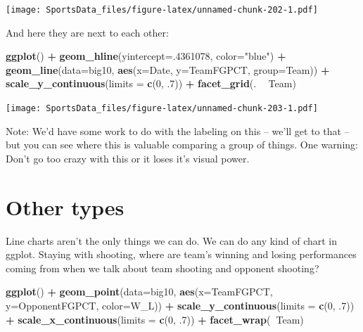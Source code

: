 \documentclass[
]{book}
\newenvironment{Shaded}{\begin{snugshade}}{\end{snugshade}}
\newcommand{\DataTypeTok}[1]{\textcolor[rgb]{0.13,0.29,0.53}{#1}}
\newcommand{\DecValTok}[1]{\textcolor[rgb]{0.00,0.00,0.81}{#1}}
\newcommand{\FloatTok}[1]{\textcolor[rgb]{0.00,0.00,0.81}{#1}}
\newcommand{\KeywordTok}[1]{\textcolor[rgb]{0.13,0.29,0.53}{\textbf{#1}}}
\newcommand{\NormalTok}[1]{#1}
\newcommand{\OperatorTok}[1]{\textcolor[rgb]{0.81,0.36,0.00}{\textbf{#1}}}
\newcommand{\StringTok}[1]{\textcolor[rgb]{0.31,0.60,0.02}{#1}}
\begin{document}
\texttt{[image: SportsData\_files/figure-latex/unnamed-chunk-202-1.pdf]}

And here they are next to each other:

\begin{Shaded}
\begin{Highlighting}[]
\KeywordTok{ggplot}\NormalTok{() }\OperatorTok{+}\StringTok{ }
\StringTok{  }\KeywordTok{geom_hline}\NormalTok{(}\DataTypeTok{yintercept=}\NormalTok{.}\DecValTok{4361078}\NormalTok{, }\DataTypeTok{color=}\StringTok{"blue"}\NormalTok{) }\OperatorTok{+}\StringTok{ }
\StringTok{  }\KeywordTok{geom_line}\NormalTok{(}\DataTypeTok{data=}\NormalTok{big10, }\KeywordTok{aes}\NormalTok{(}\DataTypeTok{x=}\NormalTok{Date, }\DataTypeTok{y=}\NormalTok{TeamFGPCT, }\DataTypeTok{group=}\NormalTok{Team)) }\OperatorTok{+}\StringTok{ }
\StringTok{  }\KeywordTok{scale_y_continuous}\NormalTok{(}\DataTypeTok{limits =} \KeywordTok{c}\NormalTok{(}\DecValTok{0}\NormalTok{, }\FloatTok{.7}\NormalTok{)) }\OperatorTok{+}\StringTok{ }
\StringTok{  }\KeywordTok{facet_grid}\NormalTok{(. }\OperatorTok{~}\StringTok{ }\NormalTok{Team)}
\end{Highlighting}
\end{Shaded}

\texttt{[image: SportsData\_files/figure-latex/unnamed-chunk-203-1.pdf]}

Note: We'd have some work to do with the labeling on this -- we'll get to that -- but you can see where this is valuable comparing a group of things. One warning: Don't go too crazy with this or it loses it's visual power.

\hypertarget{other-types}{%
\section{Other types}\label{other-types}}

Line charts aren't the only things we can do. We can do any kind of chart in ggplot. Staying with shooting, where are team's winning and losing performances coming from when we talk about team shooting and opponent shooting?

\begin{Shaded}
\begin{Highlighting}[]
\KeywordTok{ggplot}\NormalTok{() }\OperatorTok{+}\StringTok{ }
\StringTok{  }\KeywordTok{geom_point}\NormalTok{(}\DataTypeTok{data=}\NormalTok{big10, }\KeywordTok{aes}\NormalTok{(}\DataTypeTok{x=}\NormalTok{TeamFGPCT, }\DataTypeTok{y=}\NormalTok{OpponentFGPCT, }\DataTypeTok{color=}\NormalTok{W_L)) }\OperatorTok{+}
\StringTok{  }\KeywordTok{scale_y_continuous}\NormalTok{(}\DataTypeTok{limits =} \KeywordTok{c}\NormalTok{(}\DecValTok{0}\NormalTok{, }\FloatTok{.7}\NormalTok{)) }\OperatorTok{+}\StringTok{ }
\StringTok{  }\KeywordTok{scale_x_continuous}\NormalTok{(}\DataTypeTok{limits =} \KeywordTok{c}\NormalTok{(}\DecValTok{0}\NormalTok{, }\FloatTok{.7}\NormalTok{)) }\OperatorTok{+}\StringTok{ }
\StringTok{  }\KeywordTok{facet_wrap}\NormalTok{(}\OperatorTok{~}\NormalTok{Team)}
\end{Highlighting}
\end{Shaded}
\end{document}
